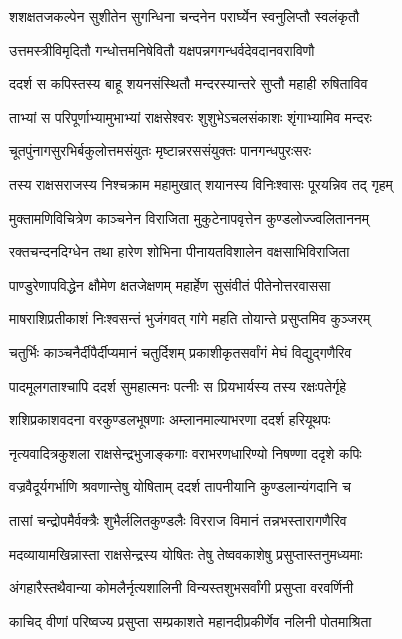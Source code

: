 \twolineshloka
{शशक्षतजकल्पेन सुशीतेन सुगन्धिना}
{चन्दनेन परार्घ्येन स्वनुलिप्तौ स्वलंकृतौ} %

\twolineshloka
{उत्तमस्त्रीविमृदितौ गन्धोत्तमनिषेवितौ}
{यक्षपन्नगगन्धर्वदेवदानवराविणौ} %

\twolineshloka
{ददर्श स कपिस्तस्य बाहू शयनसंस्थितौ}
{मन्दरस्यान्तरे सुप्तौ महाही रुषिताविव} %

\twolineshloka
{ताभ्यां स परिपूर्णाभ्यामुभाभ्यां राक्षसेश्वरः}
{शुशुभेऽचलसंकाशः शृंगाभ्यामिव मन्दरः} %

\twolineshloka
{चूतपुंनागसुरभिर्बकुलोत्तमसंयुतः}
{मृष्टान्नरससंयुक्तः पानगन्धपुरःसरः} %

\twolineshloka
{तस्य राक्षसराजस्य निश्चक्राम महामुखात्}
{शयानस्य विनिःश्वासः पूरयन्निव तद् गृहम्} %

\twolineshloka
{मुक्तामणिविचित्रेण काञ्चनेन विराजिता}
{मुकुटेनापवृत्तेन कुण्डलोज्ज्वलिताननम्} %

\twolineshloka
{रक्तचन्दनदिग्धेन तथा हारेण शोभिना}
{पीनायतविशालेन वक्षसाभिविराजिता} %

\twolineshloka
{पाण्डुरेणापविद्धेन क्षौमेण क्षतजेक्षणम्}
{महार्हेण सुसंवीतं पीतेनोत्तरवाससा} %

\twolineshloka
{माषराशिप्रतीकाशं निःश्वसन्तं भुजंगवत्}
{गांगे महति तोयान्ते प्रसुप्तमिव कुञ्जरम्} %

\twolineshloka
{चतुर्भिः काञ्चनैर्दीपैर्दीप्यमानं चतुर्दिशम्}
{प्रकाशीकृतसर्वांगं मेघं विद्युद्गणैरिव} %

\twolineshloka
{पादमूलगताश्चापि ददर्श सुमहात्मनः}
{पत्नीः स प्रियभार्यस्य तस्य रक्षःपतेर्गृहे} %

\twolineshloka
{शशिप्रकाशवदना वरकुण्डलभूषणाः}
{अम्लानमाल्याभरणा ददर्श हरियूथपः} %

\twolineshloka
{नृत्यवादित्रकुशला राक्षसेन्द्रभुजाङ्कगाः}
{वराभरणधारिण्यो निषण्णा ददृशे कपिः} %

\twolineshloka
{वज्रवैदूर्यगर्भाणि श्रवणान्तेषु योषिताम्}
{ददर्श तापनीयानि कुण्डलान्यंगदानि च} %

\twolineshloka
{तासां चन्द्रोपमैर्वक्त्रैः शुभैर्ललितकुण्डलैः}
{विरराज विमानं तन्नभस्तारागणैरिव} %

\twolineshloka
{मदव्यायामखिन्नास्ता राक्षसेन्द्रस्य योषितः}
{तेषु तेष्ववकाशेषु प्रसुप्तास्तनुमध्यमाः} %

\twolineshloka
{अंगहारैस्तथैवान्या कोमलैर्नृत्यशालिनी}
{विन्यस्तशुभसर्वांगी प्रसुप्ता वरवर्णिनी} %

\twolineshloka
{काचिद् वीणां परिष्वज्य प्रसुप्ता सम्प्रकाशते}
{महानदीप्रकीर्णेव नलिनी पोतमाश्रिता} %

